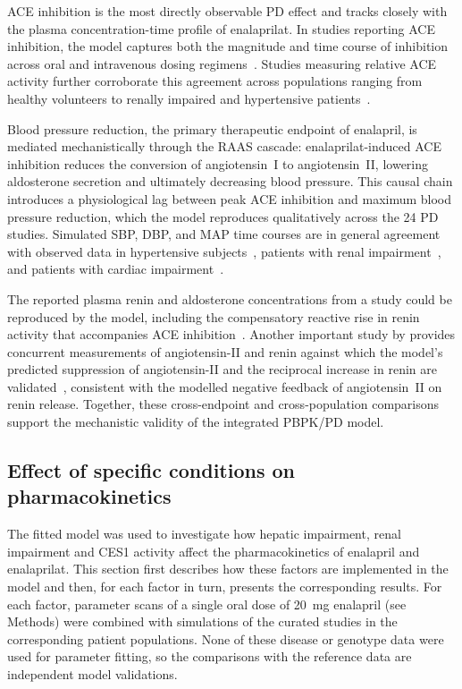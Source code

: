 \documentclass[pharmaceutics,article,submit,pdftex,moreauthors]{Definitions/mdpi}
\begin{document}
ACE inhibition is the most directly observable PD effect and tracks closely with the plasma concentration-time profile of enalaprilat. In studies reporting ACE inhibition, the model captures both the magnitude and time course of inhibition across oral and intravenous dosing regimens~\cite{Biollaz1982, Hockings1986}. Studies measuring relative ACE activity further corroborate this agreement across populations ranging from healthy volunteers to renally impaired and hypertensive patients~\cite{Donnelly1990, Schwartz1985, Shionoiri1985, Wade1992, Weisser1992}.

Blood pressure reduction, the primary therapeutic endpoint of enalapril, is mediated mechanistically through the RAAS cascade: enalaprilat-induced ACE inhibition reduces the conversion of angiotensin~I to angiotensin~II, lowering aldosterone secretion and ultimately decreasing blood pressure. This causal chain introduces a physiological lag between peak ACE inhibition and maximum blood pressure reduction, which the model reproduces qualitatively across the 24 PD studies. Simulated SBP, DBP, and MAP time courses are in general agreement with observed data in hypertensive subjects~\cite{Schwartz1985, Shionoiri1985, Marzo2002}, patients with renal impairment~\cite{Lees1987a, Lowenthal1985, Weisser1992}, and patients with cardiac impairment~\cite{Dickstein1987a, Schwartz1985}.

The reported plasma renin and aldosterone concentrations from a study could be reproduced by the model, including the compensatory reactive rise in renin activity that accompanies ACE inhibition~\cite{Schwartz1985}. Another important study by  provides concurrent measurements of angiotensin-II and renin against which the model's predicted suppression of angiotensin-II and the reciprocal increase in renin are validated~\cite{Shionoiri1985}, consistent with the modelled negative feedback of angiotensin~II on renin release. Together, these cross-endpoint and cross-population comparisons support the mechanistic validity of the integrated PBPK/PD model.

\subsection{Effect of specific conditions on pharmacokinetics}\label{sec:results_conditions}
The fitted model was used to investigate how hepatic impairment, renal impairment and CES1 activity affect the pharmacokinetics of enalapril and enalaprilat. This section first describes how these factors are implemented in the model and then, for each factor in turn, presents the corresponding results. For each factor, parameter scans of a single oral dose of 20~mg enalapril (see Methods) were combined with simulations of the curated studies in the corresponding patient populations. None of these disease or genotype data were used for parameter fitting, so the comparisons with the reference data are independent model validations.
\end{document}
